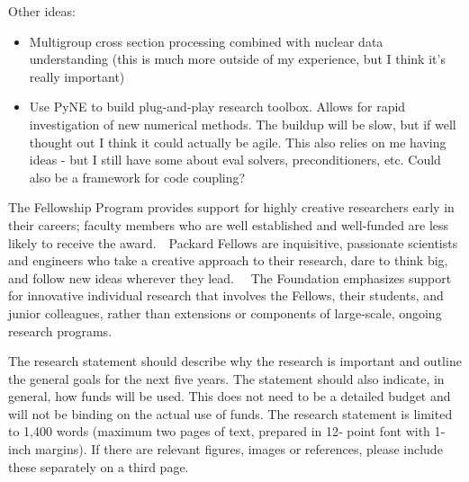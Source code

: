 \documentclass{proposalnsf}
\newlength{\up}
\begin{document}
Other ideas: 
\begin{itemize}
\item Multigroup cross section processing combined with nuclear data understanding
      (this is much more outside of my experience, but I think it's really 
       important)
\item Use PyNE to build plug-and-play research toolbox. Allows for rapid
      investigation of new numerical methods. The buildup will be slow, but if 
      well thought out I think it could actually be agile. This also relies on 
      me having ideas - but I still have some about eval solvers, preconditioners,
      etc. Could also be a framework for code coupling?
\end{itemize}


The Fellowship Program provides support for highly
creative researchers early in their careers; faculty
members who are well established and well‐funded
are less likely to receive the award.  Packard Fellows
are inquisitive, passionate scientists and engineers
who take a creative approach to their research, dare
to think big, and follow new ideas wherever they lead.  
The Foundation emphasizes support for innovative
individual research that involves the Fellows, their
students, and junior colleagues, rather than
extensions or components of large‐scale, ongoing
research programs.  

The research statement should describe why
the research is important and outline the
general goals for the next five years. The
statement should also indicate, in general,
how funds will be used. This does not need to
be a detailed budget and will not be binding
on the actual use of funds. The research
statement is limited to 1,400 words
(maximum two pages of text, prepared in 12‐
point font with 1‐inch margins). If there are
relevant figures, images or references, please
include these separately on a third page.  
\end{document}

